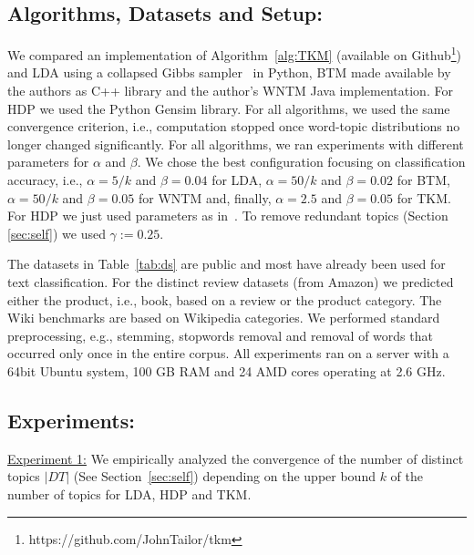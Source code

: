 \documentclass[twocolumn,10]{article}
\newcommand{\ci}{~\cite} \newcommand{\re}{~\ref} \newcommand{\ma}{\mathbb}
\begin{document}
	\subsection{Algorithms, Datasets and Setup:} %
	We compared an implementation of Algorithm\re{alg:TKM} (available on Github\footnote{https://github.com/JohnTailor/tkm}) and LDA using a collapsed Gibbs sampler\ci{gri04b} in Python, BTM made available by the authors as C++ library and the author's WNTM Java implementation. For HDP we used the Python Gensim library. For all algorithms, we used the same convergence criterion, i.e., computation stopped once word-topic distributions no longer changed significantly. For all algorithms, we ran experiments with different parameters for $\alpha$ and $\beta$. We chose the best configuration focusing on classification accuracy, i.e., $\alpha= 5/k$ and $\beta=0.04$ for LDA, $\alpha= 50/k$ and $\beta=0.02$ for BTM, $\alpha= 50/k$ and $\beta=0.05$ for WNTM and, finally, $\alpha=2.5$ and $\beta=0.05$ for TKM. For HDP we just used parameters as in\ci{wan11}. To remove redundant topics (Section \ref{sec:self}) we used $\gamma:=0.25$.

	The datasets in Table\re{tab:ds} are public and most have already been used for text classification. For the distinct review datasets (from Amazon) we predicted either the product, i.e., book, based on a review or the product category. The Wiki benchmarks are based on Wikipedia categories. We performed standard preprocessing, e.g., stemming, stopwords removal and removal of words that occurred only once in the entire corpus. All experiments ran on a server with a 64bit Ubuntu system, 100 GB RAM and 24 AMD cores operating at 2.6 GHz. %
	
	
	\subsection{Experiments:}
	\underline{Experiment 1:} 
	We empirically analyzed the convergence of the number of distinct topics $|DT|$ (See Section\re{sec:self}) depending on the upper bound $k$ of the number of topics for LDA, HDP and TKM.
	
\end{document}

